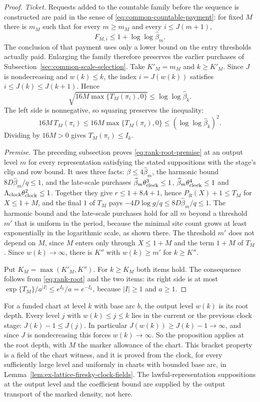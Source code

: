 \begin{proof}
\emph{Ticket.} Requests added to the countable family before the
sequence is constructed are paid in the sense of
\eqref{eq:common-countable-payment}: for fixed $M$ there is $m_M$ such
that for every $m\ge m_M$ and every $i\le J(m+1)$,
\[
 F_{M,i}\le1+\log\log\widehat\beta_m .
\]
The conclusion of that payment uses only a lower bound on the entry
thresholds actually paid. Enlarging the family therefore preserves the
earlier purchases of Subsection~\ref{sec:common-scale-selection}. Take
$K'_M=m_M$ and $k\ge K'_M$. Since $J$ is nondecreasing and $w(k)\le k$,
the index $i=J(w(k))$ satisfies $i\le J(k)\le J(k+1)$. Hence
\[
 \sqrt{16M\max\{T_M(\pi_i),0\}}\le\log\log\widehat\beta_k .
\]
The left side is nonnegative, so squaring preserves the inequality:
\[
 16M\,T_M(\pi_i)\le16M\max\{T_M(\pi_i),0\}\le(\log\log\widehat\beta_k)^2.
\]
Dividing by $16M>0$ gives $T_M(\pi_i)\le I_k$.

\emph{Premise.} The preceding subsection proves
\eqref{eq:rank-root-premise} at an output level $m$ for every
representation satisfying the stated suppositions with the stage's clip
and row bound. It uses three facts: $\beta\le4\widehat\beta_m$, the
harmonic bound $8D\widehat\beta_m/q\le1$, and the late-scale purchases
$\widehat\beta_m\theta_{\rm clock}^3\le1$,
$\widehat\beta_m\theta_{\rm clock}^4\le1$ and
$\Lambda_{\rm clock}\theta_{\rm clock}^2\le1$. Together they give
$r\le1+8A+1$, hence $P_R(X)+1\le T_M$ for $X\le1+M$, and the final $1$ of
$T_M$ pays $-4D\log g/q\le8D\widehat\beta_m/q\le1$. The harmonic bound and
the late-scale purchases hold for all $m$ beyond a threshold $m'$ that is
uniform in the period, because the minimal site count grows at least
exponentially in the logarithmic scale, as shown there. The threshold
$m'$ does not depend on $M$, since $M$ enters only through $X\le1+M$
and the term $1+M$ of $T_M$. Since $w(k)\to\infty$, there is $K''$ with
$w(k)\ge m'$ for $k\ge K''$.

Put $K_M=\max(K'_M,K'')$. For $k\ge K_M$ both items hold. The
consequence follows from \eqref{eq:rank-root} and the two items: its
right side is at most $\exp\{T_M\}/a^{|I|}\le e^{I_k}/a=e^{-I_k}$,
because $|I|\ge1$ and $a\ge1$.
\end{proof}

For a funded chart at level $k$ with base arc $b$, the output level
$w(k)$ is its root depth. Every level $j$ with $w(k)\le j\le k$ lies in
the current or the previous clock stage: $J(k)-1\le J(j)$. In
particular $J(w(k))\ge J(k)-1\to\infty$, and since $J$ is nondecreasing
this forces $w(k)\to\infty$. So the proposition applies at the root
depth, with $M$ the marker allowance of the chart. This bracket property
is a field of the chart witness, and it is proved from the clock, for
every sufficiently large level and uniformly in charts with bounded base
arc, in Lemma~\ref{lem:ex-lattice-firesky-clock-fields}. The lawful-representation suppositions at the output
level and the coefficient bound are supplied by the output transport of
the marked density, not here.

